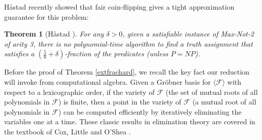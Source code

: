 \documentclass{article}
\newtheorem{thm}{Theorem}
\begin{document}
H{\aa}stad recently showed that fair coin-flipping gives a tight approximation guarantee for this problem:
\begin{thm}[H{\aa}stad \cite{hast14}]\label{hastadnot2}
For any $\delta>0$, given a satisfiable instance of Max-Not-2 of arity 3, there is no polynomial-time algorithm to find a truth assignment that satisfies a $(\frac{5}{8}+\delta)$-fraction of the predicates (unless $P=NP$). 
\end{thm}
\vspace{-1mm}

Before the proof of Theorem \ref{extfrachard}, we recall the key fact our reduction will invoke from computational algebra. Given a Gr\"{o}bner basis for  $\langle\mathcal{F}\rangle$ with respect to a lexicographic order, if the variety of  $\mathcal{F}$ (the set of mutual roots of all polynomials in $\mathcal{F}$) is finite, then a point in the variety of $\mathcal{F}$ (a mutual root of all polynomials in $\mathcal{F}$) can be computed efficiently by iteratively eliminating the variables one at a time. These classic results in elimination theory are covered in the textbook of Cox, Little and O'Shea \cite{cox}.
\end{document}
